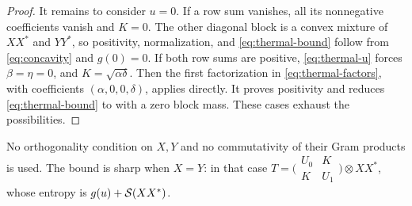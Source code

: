 \begin{proof}
It remains to consider $u=0$. If a row sum vanishes, all its
nonnegative coefficients vanish and $K=0$. The other diagonal block
is a convex mixture of $XX^*$ and $YY^*$, so positivity, normalization,
and \eqref{eq:thermal-bound} follow from \eqref{eq:concavity} and
$g(0)=0$. If both row sums are positive, \eqref{eq:thermal-u} forces
$\beta=\eta=0$, and $K=\sqrt{\alpha\delta}$. Then the first
factorization in \eqref{eq:thermal-factors}, with coefficients
$(\alpha,0,0,\delta)$, applies directly. It proves positivity and
reduces \eqref{eq:thermal-bound} to  with a zero block
mass. These cases exhaust the possibilities.
\end{proof}

\begin{remark}\label{rem:thermal-sharp}
No orthogonality condition on $X,Y$ and no commutativity of their Gram
products is used. The bound is sharp when $X=Y$: in that case
$T=\bigl(\begin{smallmatrix}U_0&K\\K&U_1\end{smallmatrix}\bigr)
\otimes XX^*$, whose entropy is $g(u)+\mathcal S(XX^*)$.
\end{remark}
